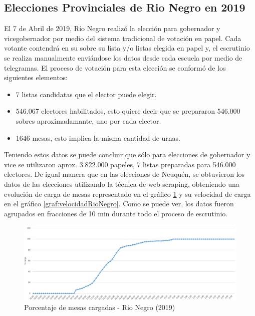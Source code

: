 \subsection{Elecciones Provinciales de Rio Negro en 2019}
El 7 de Abril de 2019, Río Negro realizó la elección para gobernador y vicegobernador por medio del sistema tradicional de votación en papel. Cada votante contendrá en su sobre su lista y/o listas elegida en papel y, el escrutinio se realiza manualmente enviándose los datos desde cada escuela por medio de telegramas. El proceso de votación para esta elección se conformó de los siguientes elementos:
\begin{itemize}
    \item 7 listas candidatas que el elector puede elegir.
    \item 546.067 electores habilitados, esto quiere decir que se prepararon 546.000 sobres aproximadamante, uno por cada elector.
    \item 1646 mesas, esto implica la misma cantidad de urnas.
\end{itemize}
Teniendo estos datos se puede concluir que sólo para elecciones de gobernador y vice se utilizaron aprox. 3.822.000 papeles, 7 listas preparadas para 546.000 electores. De igual manera que en las elecciones de Neuquén, se obtuvieron los datos de las elecciones utilizando la técnica de web scraping, obteniendo una evolución de carga de mesas representado en el gráfico \ref{graf:porcentajeRioNegro} y su velocidad de carga en el gráfico \ref{graf:velocidadRioNegro}. Como se puede ver, los datos fueron agrupados en fracciones de 10 min durante todo el proceso de escrutinio.


\begin{figure}[h!]
  \includegraphics[width=1\textwidth]{img/sAveHlGEkX.png}
  \caption{Porcentaje de mesas cargadas - Rio Negro (2019)}
  \label{graf:porcentajeRioNegro}
\end{figure}


